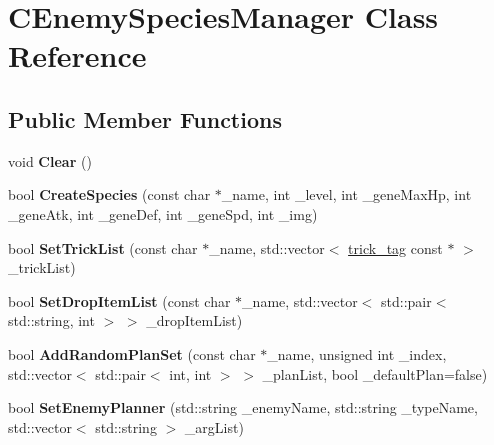 \hypertarget{class_c_enemy_species_manager}{}\section{C\+Enemy\+Species\+Manager Class Reference}
\label{class_c_enemy_species_manager}
\subsection*{Public Member Functions}
\begin{DoxyCompactItemize}
\item 
void {\bfseries Clear} ()\hypertarget{class_c_enemy_species_manager_a61bff3c97ea2615e6f212f8fd90f2cbd}{}\label{class_c_enemy_species_manager_a61bff3c97ea2615e6f212f8fd90f2cbd}

\item 
bool {\bfseries Create\+Species} (const char $\ast$\+\_\+name, int \+\_\+level, int \+\_\+gene\+Max\+Hp, int \+\_\+gene\+Atk, int \+\_\+gene\+Def, int \+\_\+gene\+Spd, int \+\_\+img)\hypertarget{class_c_enemy_species_manager_a075696984dd79e5243239ecfcb088696}{}\label{class_c_enemy_species_manager_a075696984dd79e5243239ecfcb088696}

\item 
bool {\bfseries Set\+Trick\+List} (const char $\ast$\+\_\+name, std\+::vector$<$ \hyperlink{structtrick__tag}{trick\+\_\+tag} const $\ast$ $>$ \+\_\+trick\+List)\hypertarget{class_c_enemy_species_manager_aa73abd6d351d50a114ddb745733f99ab}{}\label{class_c_enemy_species_manager_aa73abd6d351d50a114ddb745733f99ab}

\item 
bool {\bfseries Set\+Drop\+Item\+List} (const char $\ast$\+\_\+name, std\+::vector$<$ std\+::pair$<$ std\+::string, int $>$ $>$ \+\_\+drop\+Item\+List)\hypertarget{class_c_enemy_species_manager_a62f78b19892fb446413109e1e491f698}{}\label{class_c_enemy_species_manager_a62f78b19892fb446413109e1e491f698}

\item 
bool {\bfseries Add\+Random\+Plan\+Set} (const char $\ast$\+\_\+name, unsigned int \+\_\+index, std\+::vector$<$ std\+::pair$<$ int, int $>$ $>$ \+\_\+plan\+List, bool \+\_\+default\+Plan=false)\hypertarget{class_c_enemy_species_manager_ae885e38198c0920abf4b94dd8aaa4493}{}\label{class_c_enemy_species_manager_ae885e38198c0920abf4b94dd8aaa4493}

\item 
bool {\bfseries Set\+Enemy\+Planner} (std\+::string \+\_\+enemy\+Name, std\+::string \+\_\+type\+Name, std\+::vector$<$ std\+::string $>$ \+\_\+arg\+List)\hypertarget{class_c_enemy_species_manager_a5bd6ed0db0ae0ae3c730da688c99ca07}{}\label{class_c_enemy_species_manager_a5bd6ed0db0ae0ae3c730da688c99ca07}


\end{DoxyCompactItemize}
